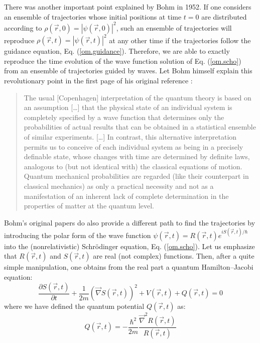 \documentclass[nofootinbib, secnumarabic, amsmath, nobibnotes,10pt,aps,pra]{revtex4-1}
\newcommand{\eref}[1]{Eq. (\ref{#1})}
\begin{document}
There was another important point explained by Bohm in 1952. If one considers an ensemble of trajectories whose initial positions at time $t = 0$ are distributed according to $\rho(\vec{r},0) = |\psi(\vec{r},0)|^2$, such an ensemble of trajectories will reproduce $\rho(\vec{r},t) = |\psi(\vec{r},t)|^2$ at any other time if the trajectories follow the guidance equation, \eref{om.guidance}. Therefore, we are able to exactly reproduce the time evolution of the wave function solution of \eref{om.scho} from an ensemble of trajectories guided by waves. Let Bohm himself explain this revolutionary point in the first page of his original reference \cite{om.bohm1952a}:\\
\begin{quote}
The usual [Copenhagen] interpretation of the quantum theory is based
on an assumption [\ldots] that the physical state of an individual
system is completely specified by a wave function that determines
only the probabilities of actual results that can be obtained in a
statistical ensemble of similar experiments. [\ldots] In contrast,
this alternative interpretation permits us to conceive of each
individual system as being in a precisely definable state, whose
changes with time are determined by definite laws, analogous to (but
not identical with) the classical equations of motion. Quantum
mechanical probabilities are regarded (like their counterpart in
classical mechanics) as only a practical necessity and not as a
manifestation of an inherent lack of complete determination in the
properties of matter at the quantum level.\\
\end{quote}
Bohm's original papers do also provide a different path to find the trajectories by
introducing the polar form of the wave function $\psi(\vec{r},t) =
R(\vec{r},t) e^{i S(\vec{r},t)/\hbar}$ into the (nonrelativistic)
Schr\"odinger equation, \eref{om.scho}. Let us emphasize that
$R(\vec{r},t)$ and $S(\vec{r},t)$ are real (not complex) functions. Then, after a
quite simple manipulation, one obtains from the real part a quantum
Hamilton--Jacobi equation:
\begin{equation}
\label{om.hamitlon2}
 \frac{\partial S(\vec{r},t)}{\partial t} + \frac{1}{2m} \left(\vec{\nabla} S(\vec{r},t)\right)^{2} + V(\vec{r},t) + Q(\vec{r},t) = 0
\end{equation}
where we have defined the quantum potential $Q(\vec{r},t)$ as:
\begin{equation}
\label{om.hamitlon3}
 Q(\vec{r},t) = -\frac{\hbar^{2}}{2 m} \frac{\vec{\nabla}^{2}R(\vec{r},t)}{R(\vec{r},t)}
\end{equation}
\end{document}
